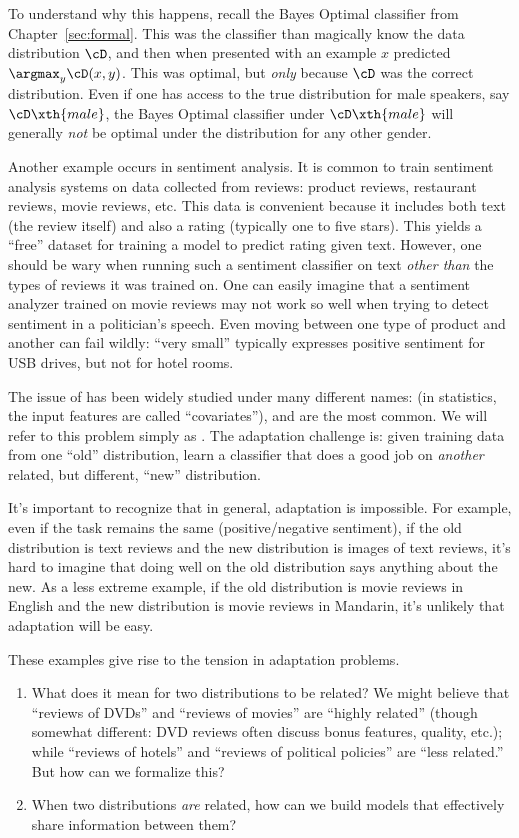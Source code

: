 To understand why this happens, recall the Bayes Optimal classifier from Chapter~\ref{sec:formal}. This was the classifier than magically know the data distribution $\cD$, and then when presented with an example $x$ predicted $\argmax_y \cD(x,y)$. This was optimal, but \emph{only} because $\cD$ was the correct distribution. Even if one has access to the true distribution for male speakers, say $\cD\xth{male}$, the Bayes Optimal classifier under $\cD\xth{male}$ will generally \emph{not} be optimal under the distribution for any other gender.

Another example occurs in sentiment analysis.
It is common to train sentiment analysis systems on data collected from reviews: product reviews, restaurant reviews, movie reviews, etc.
This data is convenient because it includes both text (the review itself) and also a rating (typically one to five stars).
This yields a ``free'' dataset for training a model to predict rating given text.
However, one should be wary when running such a sentiment classifier on text \emph{other than} the types of reviews it was trained on.
One can easily imagine that a sentiment analyzer trained on movie reviews may not work so well when trying to detect sentiment in a politician's speech.
Even moving between one type of product and another can fail wildly: ``very small'' typically expresses positive sentiment for USB drives, but not for hotel rooms.

The issue of  has been widely studied under many different names:  (in statistics, the input features are called ``covariates''),  and  are the most common. We will refer to this problem simply as . The adaptation challenge is: given training data from one ``old'' distribution, learn a classifier that does a good job on \emph{another} related, but different, ``new'' distribution.

It's important to recognize that in general, adaptation is impossible.
For example, even if the task remains the same (positive/negative sentiment), if the old distribution is text reviews and the new distribution is images of text reviews, it's hard to imagine that doing well on the old distribution says anything about the new.
As a less extreme example, if the old distribution is movie reviews in English and the new distribution is movie reviews in Mandarin, it's unlikely that adaptation will be easy.

These examples give rise to the tension in adaptation problems.
\begin{enumerate}
\item What does it mean for two distributions to be related?
We might believe that ``reviews of DVDs'' and ``reviews of movies'' are ``highly related'' (though somewhat different: DVD reviews often discuss bonus features, quality, etc.); while ``reviews of hotels'' and ``reviews of political policies'' are ``less related.''
But how can we formalize this?
\item When two distributions \emph{are} related, how can we build models that effectively share information between them?
\end{enumerate}

